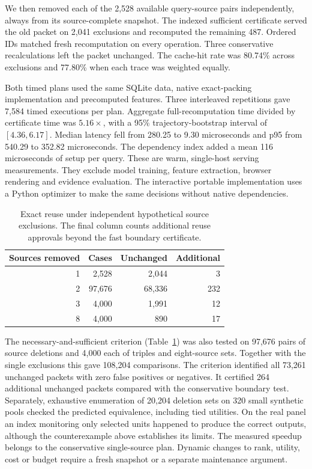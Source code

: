 \documentclass[conference]{IEEEtran}
\begin{document}
We then removed each of the 2,528 available query-source pairs independently, always from its source-complete snapshot. The indexed sufficient certificate served the old packet on 2,041 exclusions and recomputed the remaining 487. Ordered IDs matched fresh recomputation on every operation. Three conservative recalculations left the packet unchanged. The cache-hit rate was 80.74\% across exclusions and 77.80\% when each trace was weighted equally.

Both timed plans used the same SQLite data, native exact-packing implementation and precomputed features. Three interleaved repetitions gave 7,584 timed executions per plan. Aggregate full-recomputation time divided by certificate time was $5.16\times$, with a 95\% trajectory-bootstrap interval of $[4.36,6.17]$. Median latency fell from 280.25 to 9.30 microseconds and p95 from 540.29 to 352.82 microseconds. The dependency index added a mean 116 microseconds of setup per query. These are warm, single-host serving measurements. They exclude model training, feature extraction, browser rendering and evidence evaluation. The interactive portable implementation uses a Python optimizer to make the same decisions without native dependencies.

\balance
\begin{table}[t]
\caption{Exact reuse under independent hypothetical source exclusions. The final column counts additional reuse approvals beyond the fast boundary certificate.}
\centering\small
\begin{tabular}{rrrr}\toprule
Sources removed & Cases & Unchanged & Additional\\\midrule
1 & 2,528 & 2,044 & 3\\
2 & 97,676 & 68,336 & 232\\
3 & 4,000 & 1,991 & 12\\
8 & 4,000 & 890 & 17\\
\bottomrule\end{tabular}
\label{tab:exclusions}
\end{table}

The necessary-and-sufficient criterion (Table~\ref{tab:exclusions}) was also tested on 97,676 pairs of source deletions and 4,000 each of triples and eight-source sets. Together with the single exclusions this gave 108,204 comparisons. The criterion identified all 73,261 unchanged packets with zero false positives or negatives. It certified 264 additional unchanged packets compared with the conservative boundary test. Separately, exhaustive enumeration of 20,204 deletion sets on 320 small synthetic pools checked the predicted equivalence, including tied utilities. On the real panel an index monitoring only selected units happened to produce the correct outputs, although the counterexample above establishes its limits. The measured speedup belongs to the conservative single-source plan. Dynamic changes to rank, utility, cost or budget require a fresh snapshot or a separate maintenance argument.
\end{document}
